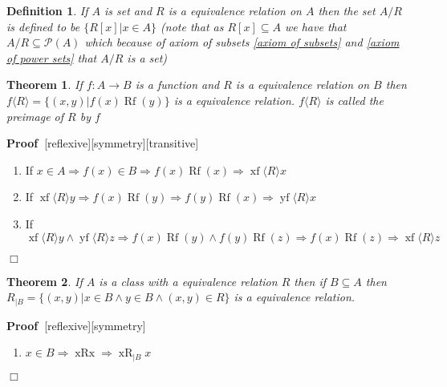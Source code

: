 \documentclass{book}
\newcommand{\nobracket}{}
\newcommand{\tmop}[1]{\ensuremath{\operatorname{#1}}}
\newenvironment{proof}{\noindent\textbf{Proof\ }}{\hspace*{\fill}$\Box$\medskip}
\newtheorem{definition}{Definition}
{\theorembodyfont{\rmfamily}\newtheorem{example}{Example}}
\newtheorem{theorem}{Theorem}
\begin{document}
{{\begin{definition}
  \label{A/R R is a equivalence relation}{}If $A$ is set and
  $R$ is a equivalence relation on $A$ then the set $A / R$ is defined to be
  $\{ R [x] | x \in A \nobracket \}$ (note that as $R [x] \subseteq A$ we have
  that $A / R \subseteq \mathcal{P} (A)$ which because of axiom of subsets
  \ref{axiom of subsets} and \ref{axiom of power sets} that $A / R$ is a set)
\end{definition}

\begin{theorem}
  \label{preimage of a relation}If $f : A \rightarrow B$ is a function and $R$
  is a equivalence relation on $B$ then $f \langle R \rangle = \{ (x, y) | f
  (x) \tmop{Rf} (y) \nobracket \}$ is a equivalence relation. $f \langle R
  \rangle$ is called the preimage of $R$ by $f$
\end{theorem}

\begin{proof}[reflexive][symmetry][transitive]
  
  \begin{enumerate}
    \item If $x \in A \Rightarrow f (x) \in B \Rightarrow f (x) \tmop{Rf} (x)
    \Rightarrow \tmop{xf} \langle R \rangle x$
    
    \item If $\tmop{xf} \langle R \rangle y \Rightarrow f (x) \tmop{Rf} (y)
    \Rightarrow f (y) \tmop{Rf} (x) \Rightarrow \tmop{yf} \langle R \rangle x$
    
    \item If $\tmop{xf} \langle R \rangle y \wedge \tmop{yf} \langle R \rangle
    z \Rightarrow f (x) \tmop{Rf} (y) \wedge f (y) \tmop{Rf} (z) \Rightarrow f
    (x) \tmop{Rf} (z) \Rightarrow \tmop{xf} \langle R \rangle z$
  \end{enumerate}
\end{proof}

\begin{theorem}
  \label{restriction of a equivalence relation}{}If $A$ is a class with a equivalence relation $R$ then
  if $B \subseteq A$ then $R_{| B \nobracket} = \{ (x, y) | x \in B \wedge y
  \in B \wedge (x, y) \in R \nobracket \}$ is a equivalence relation.
\end{theorem}

\begin{proof}[reflexive][symmetry]
  
  \begin{enumerate}
    \item $x \in B \Rightarrow \tmop{xRx} \Rightarrow \tmop{xR}_{| B
    \nobracket} x$
    

\end{enumerate}
\end{proof}}}
\end{document}
